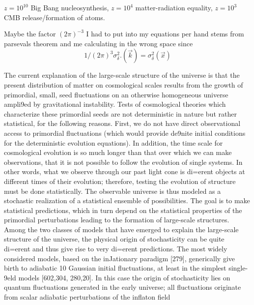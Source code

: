 \begin{description}
\item[time line]  $z=10^{10}$ Big Bang nucleosynthesis, $z=10^4$ matter-radiation equality, $z=10^3$ CMB release/formation of atoms.
\item  Maybe the factor $(2 \pi)^{-3}$ I had to put into my equations per hand stems from parsevals theorem and me calculating in the wrong space since
\[ 1/(2\pi)^3 \sigma^2_{\delta}.(\vec{k}) = \sigma^2_{\delta}(\vec{x})\]
\item[Structure formation standard model]
The current explanation of the large-scale
structure of the universe is that the present distribution of matter on cosmological scales results from
the growth of primordial, small, seed fluctuations on an otherwise homogeneous universe ampli9ed
by gravitational instability. Tests of cosmological theories which characterize these primordial seeds
are not deterministic in nature but rather statistical, for the following reasons. First, we do not have
direct observational access to primordial fluctuations (which would provide de9nite initial conditions
for the deterministic evolution equations). In addition, the time scale for cosmological evolution is
so much longer than that over which we can make observations, that it is not possible to follow the
evolution of single systems. In other words, what we observe through our past light cone is di=erent
objects at different times of their evolution; therefore, testing the evolution of structure must be done
statistically.
The observable universe is thus modeled as a stochastic realization of a statistical ensemble of
possibilities. The goal is to make statistical predictions, which in turn depend on the statistical
properties of the primordial perturbations leading to the formation of large-scale structures. Among
the two classes of models that have emerged to explain the large-scale structure of the universe, the
physical origin of stochasticity can be quite di=erent and thus give rise to very di=erent predictions.
The most widely considered models, based on the inJationary paradigm [279], generically give
birth to adiabatic 10 Gaussian initial fluctuations, at least in the simplest single-9eld models [602,304,
280,20]. In this case the origin of stochasticity lies on quantum fluctuations generated in the early
universe; all fluctuations originate from scalar adiabatic perturbations of the inflaton field


\end{description}
